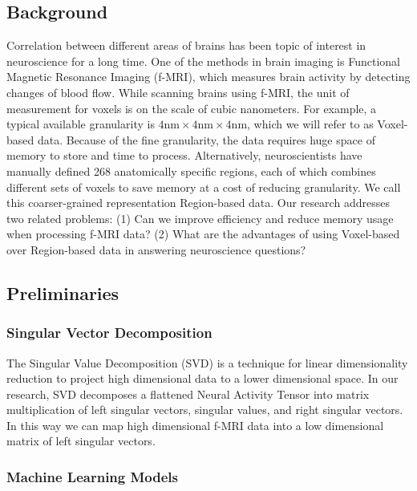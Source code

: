 \documentclass{article}[12pt]
\begin{document}
\subsection{Background}
Correlation between different areas of brains has been topic of interest in neuroscience for a long time. One of the methods in brain imaging is Functional Magnetic Resonance Imaging (f-MRI), which measures brain activity by detecting changes of blood flow. While scanning brains using f-MRI, the unit of measurement for voxels is on the scale of cubic nanometers. For example, a typical available granularity is $4\text{nm} \times 4\text{nm} \times 4\text{nm} $, which we will refer to as Voxel-based data.  Because of the fine granularity, the data requires huge space of memory to store and time to process. Alternatively, neuroscientists have manually defined 268 anatomically specific regions, each of which combines different sets of voxels to save memory at a cost of reducing granularity. We call this coarser-grained representation Region-based data. Our research addresses two related problems: (1) Can we improve efficiency and reduce memory usage when processing f-MRI data? (2) What are the advantages of using Voxel-based over Region-based data in answering neuroscience questions?

\subsection{Preliminaries}

\subsubsection{Singular Vector Decomposition}
The Singular Value Decomposition (SVD) is a technique for linear dimensionality reduction to project high dimensional data to a lower dimensional space.  In our research, SVD decomposes a flattened Neural Activity Tensor into matrix multiplication of left singular vectors, singular values, and right singular vectors. In this way we can map high dimensional f-MRI data into a low dimensional matrix of left singular vectors.

\subsubsection{Machine Learning Models}
\end{document}
